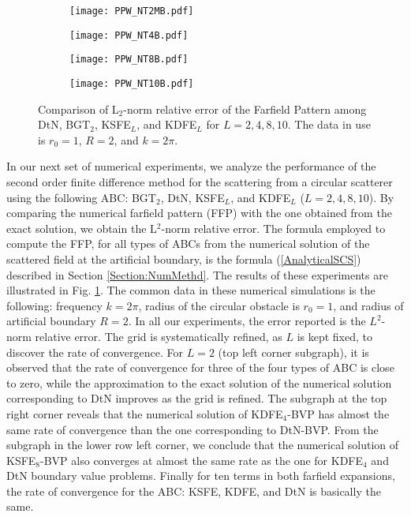 \documentclass[final,3p,times,12pt]{elsarticle}
\begin{document}
\begin{figure}[!h]
\begin{subfigure}{0.5\textwidth}
\texttt{[image: PPW\_NT2MB.pdf]} 
\end{subfigure}
\begin{subfigure}{0.5\textwidth}
\texttt{[image: PPW\_NT4B.pdf]}
\end{subfigure}
\begin{subfigure}{0.5\textwidth}
\texttt{[image: PPW\_NT8B.pdf]}
\end{subfigure}
\begin{subfigure}{0.5\textwidth}
\texttt{[image: PPW\_NT10B.pdf]}
\end{subfigure}
\caption{Comparison of L$_2$-norm relative error of the Farfield Pattern among DtN, BGT$_2$, KSFE$_L$, and KDFE$_L$ for $L=2,4,8,10$. The data in use is $r_0=1$, $R=2$, and $k=2\pi$.} 
\label{fig:ConvergencePPW}
\end{figure}

In our next set of numerical experiments, we analyze the performance of the second order finite difference method for the scattering from a circular scatterer using the following ABC: BGT$_2$, DtN, KSFE$_L$, and KDFE$_L$ ($L= 2,4,8,10$). By comparing the numerical farfield pattern (FFP) with the one obtained from the exact solution, we obtain the L$^2$-norm relative error. The formula employed to compute the FFP, for all types of ABCs from the numerical solution of the scattered field at the artificial boundary, is the formula (\ref{AnalyticalSCS}) described in Section \ref{Section:NumMethd}. 
The results of these experiments are illustrated in Fig. \ref{fig:ConvergencePPW}. The common data in these numerical 
simulations is the following: frequency $k=2\pi$, radius of the circular obstacle is $r_0 =1$, and radius of artificial boundary $R=2$. In all our experiments, the error reported  is the $L^2$-norm relative error. The grid is systematically refined, as $L$ is kept fixed,  to discover the rate of convergence. For $L=2$ (top left corner subgraph), it is observed that the rate of convergence for three of the four types of ABC is close to zero, while the approximation to the exact solution of the numerical solution corresponding to DtN improves as the grid is refined. The subgraph at the top right corner reveals that the numerical solution of KDFE$_4$-BVP has almost the same rate of convergence than the one corresponding to DtN-BVP. From the subgraph in the lower row left corner, we conclude that the numerical solution of KSFE$_8$-BVP also converges at almost the same rate as the one for KDFE$_4$ and DtN boundary value problems. Finally for ten terms in both farfield expansions, the rate of convergence for the ABC: KSFE, KDFE, and DtN is basically the same. 
\end{document}

